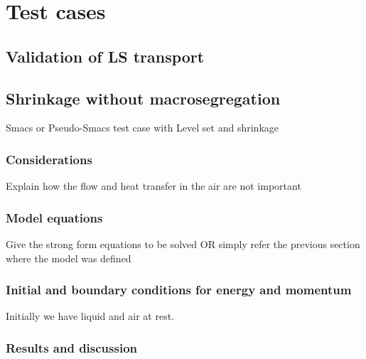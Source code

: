 \section{Test cases}

\subsection{Validation of LS transport}

\subsection{Shrinkage without macrosegregation}
Smacs or Pseudo-Smacs test case with Level set and shrinkage
\subsubsection{Considerations}
Explain how the flow and heat transfer in the air are not important \\ 
\subsubsection{Model equations}
Give the strong form equations to be solved OR simply refer the previous section where the model was defined
\subsubsection{Initial and boundary conditions for energy and momentum}
Initially we have liquid and air at rest. 
\subsubsection{Results and discussion}

